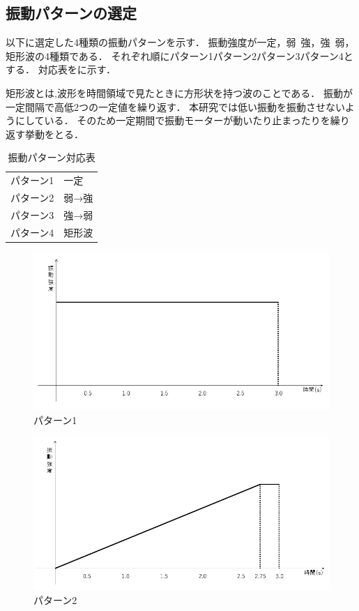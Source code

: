 \newpage
\subsection{振動パターンの選定}
以下に選定した4種類の振動パターンを示す．
振動強度が一定，弱~強，強~弱，矩形波の4種類である．
それぞれ順にパターン1パターン2パターン3パターン4とする．
対応表をに示す．

矩形波とは,波形を時間領域で見たときに方形状を持つ波のことである．
振動が一定間隔で高低2つの一定値を繰り返す．
本研究では低い振動を振動させないようにしている．
そのため一定期間で振動モーターが動いたり止まったりを繰り返す挙動をとる．

\begin{table}[H]
    \caption{振動パターン対応表}
    \centering
    \begin{tabular}{l|l}
    \hline
    \hline
    パターン1 & 一定 \\
    パターン2 & 弱→強 \\
    パターン3 & 強→弱 \\
    パターン4 & 矩形波 \\
    \hline
    \end{tabular}
    \label{tab;sindou}
\end{table}


\begin{figure}[h]
\centering
\includegraphics[clip,width=14cm]{./fig/patarn1.png}
\caption{パターン1}\label{patarn1}
\end{figure}

\begin{figure}[h]
\centering
\includegraphics[clip,width=14cm]{./fig/patarn2.png}
\caption{パターン2}\label{patarn2}
\end{figure}

